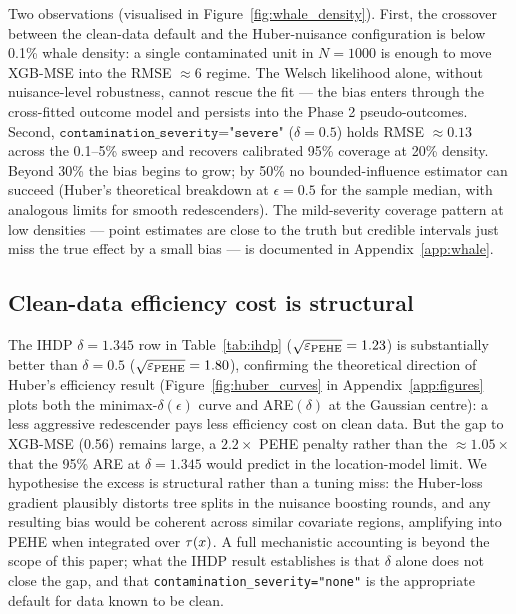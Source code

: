 Two observations (visualised in Figure~\ref{fig:whale_density}).
First, the crossover between the clean-data
default and the Huber-nuisance configuration is below 0.1\%
whale density: a single contaminated unit in $N = 1000$ is enough
to move XGB-MSE into the RMSE $\approx 6$ regime. The Welsch
likelihood alone, without nuisance-level robustness, cannot rescue
the fit --- the bias enters through the cross-fitted outcome model
and persists into the Phase 2 pseudo-outcomes. Second,
$\texttt{contamination\_severity="severe"}$
($\delta = 0.5$) holds RMSE $\approx 0.13$ across the 0.1--5\% sweep
and recovers calibrated 95\% coverage at 20\% density. Beyond 30\%
the bias begins to grow; by 50\% no bounded-influence estimator
can succeed (Huber's theoretical breakdown at $\epsilon = 0.5$ for
the sample median, with analogous limits for smooth redescenders).
The mild-severity coverage pattern at low densities --- point
estimates are close to the truth but credible intervals just miss
the true effect by a small bias --- is documented in
Appendix~\ref{app:whale}.

\subsection{Clean-data efficiency cost is structural}
\label{sec:experiments:efficiency}
The IHDP $\delta = 1.345$ row in Table~\ref{tab:ihdp}
($\sqrt{\varepsilon_{\mathrm{PEHE}}} = 1.23$) is substantially better than $\delta = 0.5$
($\sqrt{\varepsilon_{\mathrm{PEHE}}} = 1.80$), confirming the theoretical direction of Huber's
efficiency result (Figure~\ref{fig:huber_curves} in
Appendix~\ref{app:figures} plots both the minimax-$\delta(\epsilon)$
curve and ARE$(\delta)$ at the Gaussian centre): a less aggressive
redescender pays less efficiency cost on clean data. But the gap to XGB-MSE (0.56)
remains large, a $2.2 \times$ PEHE penalty rather than the
$\approx 1.05 \times$ that the 95\% ARE at $\delta = 1.345$ would
predict in the location-model limit. We hypothesise the excess is structural rather than a tuning miss:
the Huber-loss gradient plausibly distorts tree splits in the
nuisance boosting rounds, and any resulting bias would be coherent
across similar covariate regions, amplifying into PEHE when
integrated over $\tau(x)$. A full mechanistic accounting is beyond the
scope of this paper; what the IHDP result establishes is that
$\delta$ alone does not close the gap, and that
\texttt{contamination\_severity="none"} is the appropriate default
for data known to be clean.

